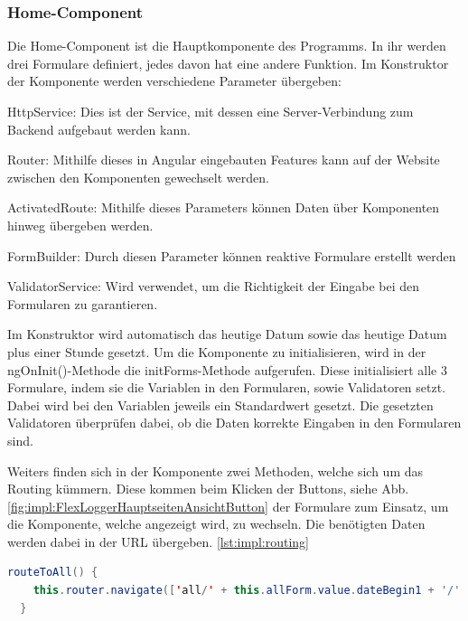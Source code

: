 \subsubsection{Home-Component}
Die Home-Component ist die Hauptkomponente des Programms. In ihr werden drei Formulare definiert, jedes davon hat eine andere Funktion. Im Konstruktor der Komponente werden verschiedene Parameter übergeben:
 
\begin{compactitem}
    \item HttpService: Dies ist der Service, mit dessen eine Server-Verbindung zum Backend aufgebaut werden kann.   
    \item Router: Mithilfe dieses in Angular eingebauten Features kann auf der Website zwischen den Komponenten gewechselt werden.       
    \item ActivatedRoute: Mithilfe dieses Parameters können Daten über Komponenten hinweg übergeben werden.   
    \item FormBuilder: Durch diesen Parameter können reaktive Formulare erstellt werden
    \item ValidatorService: Wird verwendet, um die Richtigkeit der Eingabe bei den Formularen zu garantieren.
\end{compactitem}
 
Im Konstruktor wird automatisch das heutige Datum sowie das heutige Datum plus einer Stunde gesetzt.
Um die Komponente zu initialisieren, wird in der ngOnInit()-Methode die initForms-Methode aufgerufen. Diese initialisiert alle 3 Formulare, indem sie die Variablen in den Formularen, sowie Validatoren setzt. Dabei wird bei den Variablen jeweils ein Standardwert gesetzt. Die gesetzten Validatoren überprüfen dabei, ob die Daten korrekte Eingaben in den Formularen sind.
 
Weiters finden sich in der Komponente zwei Methoden, welche sich um das Routing kümmern. Diese kommen beim Klicken der Buttons, siehe Abb. \ref{fig:impl:FlexLoggerHauptseitenAnsichtButton} der Formulare zum Einsatz, um die Komponente, welche angezeigt wird, zu wechseln. Die benötigten Daten werden dabei in der URL übergeben. \ref{lst:impl:routing}


\begin{lstlisting}[language=java,caption=Routing zu anderer Komponente,label=lst:impl:routing]
    routeToAll() {
    this.router.navigate(['all/' + this.allForm.value.dateBegin1 + '/' + this.allForm.value.timeBegin1 + '/' + this.allForm.value.dateEnd1 + '/' + this.allForm.value.timeEnd1], {relativeTo: this.route});
  }
\end{lstlisting}

